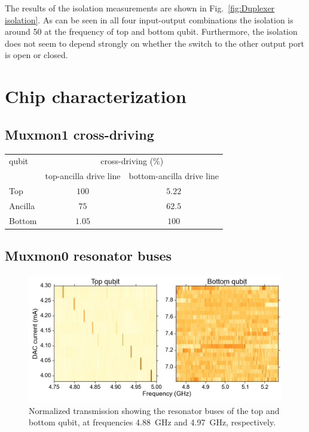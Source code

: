   The results of the isolation measurements are shown in Fig.~\ref{fig:Duplexer isolation}. As can be seen in all four input-output combinations the isolation is around \SI{50}{\dBm} at the frequency of top and bottom qubit. Furthermore, the isolation does not seem to depend strongly on whether the switch to the other output port is open or closed.

\chapter{Chip characterization}

  \section{Muxmon1 cross-driving}
    \label{sec:Muxmon1 cross-driving}
      \begin{table}[h]
        \begin{tabular}{l c c}
          \toprule
          qubit & \multicolumn{2}{c}{cross-driving (\%)} \\
          \cmidrule(lr){2-3}
               & top-ancilla drive line & bottom-ancilla drive line \\
          \midrule
          Top     & $100$    & $5.22$ \\
          Ancilla & $75$ & $62.5$ \\
          Bottom  & $1.05$ & $100$    \\
          \bottomrule
        \end{tabular}
        \label{tab:Muxmon1 cross-driving}
      \end{table}

  \section{Muxmon0 resonator buses}
    \label{sec:Resonator buses}

    \begin{figure}[h]
      \centering
      \includegraphics[width=\textwidth]{Figures/Appendix/resonator buses.png}
      \caption{Normalized transmission showing the resonator buses of the top and bottom qubit, at frequencies \SI{4.88}{\giga \hertz} and \SI{4.97}{\giga \hertz}, respectively.}
      \label{fig:resonator buses}
    \end{figure}

